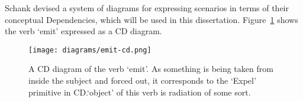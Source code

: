     Schank devised a system of diagrams for expressing scenarios in terms of their conceptual Dependencies, which will be used in this dissertation. Figure~\ref{fig:emit-cd} shows the verb `emit' expressed as a CD diagram.
    \begin{figure}
        \centerline{
            \texttt{[image: diagrams/emit-cd.png]}
        }
        \caption{A CD diagram of the verb `emit'. As something is being taken from inside the subject and forced out, it corresponds to the `Expel' primitive in CD.\@The `object' of this verb is radiation of some sort.}
        \label{fig:emit-cd}
    \end{figure}


    
    
% 